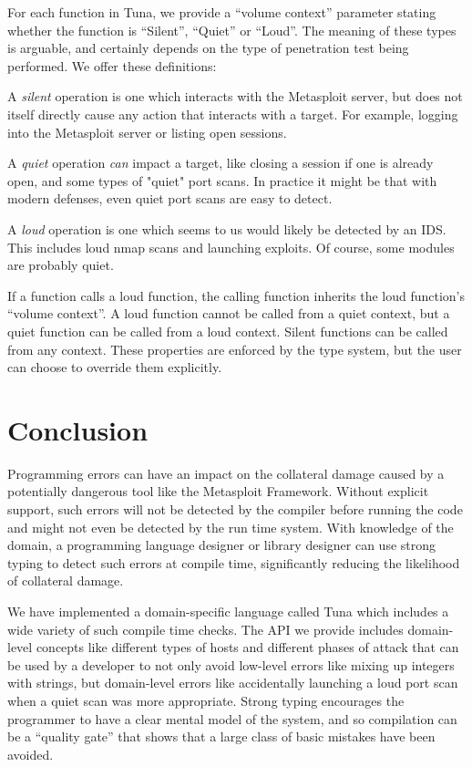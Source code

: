 \documentclass[figure,letterpaper,onefignum]{mysiam}
\begin{document}
For each function in Tuna, we provide a ``volume context'' parameter stating whether the function is ``Silent'', ``Quiet'' or ``Loud''. The meaning of these types is arguable, and certainly depends on the type of penetration test being performed. We offer these definitions:

A \emph{silent} operation is one which interacts with the Metasploit server, but does not itself directly cause any action that interacts with a target. For example, logging into the Metasploit server or listing open sessions.

A \emph{quiet} operation \emph{can} impact a target, like closing a session if one is already open, and some types of "quiet" port scans. In practice it might be that with modern defenses, even quiet port scans are easy to detect.

A \emph{loud} operation is one which seems to us would likely be detected by an IDS. This includes loud nmap scans and launching exploits. Of course, some modules are probably quiet.

If a function calls a loud function, the calling function inherits the loud function's ``volume context''. A loud function cannot be called from a quiet context, but a quiet function can be called from a loud context. Silent functions can be called from any context. These properties are enforced by the type system, but the user can choose to override them explicitly.

\section{Conclusion}
Programming errors can have an impact on the collateral damage caused by a potentially dangerous tool like the Metasploit Framework. Without explicit support, such errors will not be detected by the compiler before running the code and might not even be detected by the run time system. With knowledge of the domain, a programming language designer or library designer can use strong typing to detect such errors at compile time, significantly reducing the likelihood of collateral damage.

We have implemented a domain-specific language called Tuna which includes a wide variety of such compile time checks. The API we provide includes domain-level concepts like different types of hosts and different phases of attack that can be used by a developer to not only avoid low-level errors like mixing up integers with strings, but domain-level errors like accidentally launching a loud port scan when a quiet scan was more appropriate. Strong typing encourages the programmer to have a clear mental model of the system, and so compilation can be a ``quality gate'' that shows that a large class of basic mistakes have been avoided.  
\end{document}
